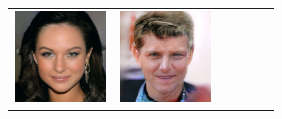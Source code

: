 \documentclass{article}
\newcommand{\pganw}{0.95in}
\begin{document}
\begin{table}[htbp]
\begin{center}
\begin{tabular}{cc|cc|cc}
\includegraphics[width=\pganw]{figures/pgan/57_base_iso_base.jpg} &
\includegraphics[width=\pganw]{figures/pgan/56_base_iso_reject.jpg} &

\end{tabular}
\end{center}
\end{table}
\end{document}
